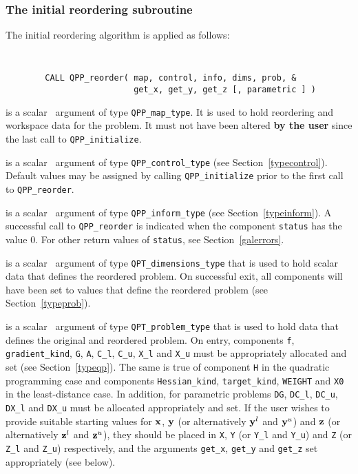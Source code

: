 \documentclass{galahad}
\newcommand{\packagename}{QPP}
\begin{document}
\subsubsection{The initial reordering subroutine}
The initial reordering algorithm is applied as follows: 
\vspace*{-2mm}
{\tt 
\begin{verbatim}
        CALL QPP_reorder( map, control, info, dims, prob, &
                          get_x, get_y, get_z [, parametric ] )
\end{verbatim}
}
\vspace*{-4mm}
\begin{description}
 is a scalar \intentinout\ argument of type 
{\tt \packagename\_map\_type}. 
It is used to hold reordering and workspace data for the problem. 
It must not have been altered {\bf by the user} since the last call
to {\tt \packagename\_initialize}. 
 
 is a scalar \intentin\ argument of type 
{\tt \packagename\_control\_type} 
(see Section~\ref{typecontrol}). 
Default values may be assigned by calling 
{\tt \packagename\_initialize} 
prior to the first call to {\tt \packagename\_reorder}. 
 
 is a scalar \intentout\ argument of type 
{\tt \packagename\_inform\_type} 
(see Section~\ref{typeinform}). 
A successful call to {\tt \packagename\_reor\-der} is indicated 
when the component {\tt status} has the value 0. For other return values 
of {\tt status}, see Section~\ref{galerrors}. 
 
 is a scalar \intentout\ argument of type 
{\tt QPT\_dimensions\_type} that 
is used to hold scalar data that defines the reordered problem. 
On successful exit, all components will have been set to values 
that define the reordered problem (see Section~\ref{typeprob}). 
 
 is a scalar \intentinout\ argument of type 
{\tt QPT\_problem\_type} that 
is used to hold data that defines the original and reordered problem. 
On entry, components {\tt f}, {\tt gradient\_kind}, {\tt G},
{\tt A}, {\tt C\_l}, {\tt C\_u}, {\tt X\_l} and {\tt X\_u} 
must be appropriately allocated and set (see Section~\ref{typeqp}).
The same is true of component {\tt H} in the quadratic programming case
and components {\tt Hessian\_kind}, {\tt target\_kind}, 
{\tt WEIGHT} and {\tt X0} in the least-distance case. 
In addition, for parametric problems
{\tt DG}, {\tt DC\_l}, {\tt DC\_u}, {\tt DX\_l} and {\tt DX\_u}
must be allocated appropriately and set.
If the user wishes to provide suitable starting values for ${\mathbf{x}}$, ${\mathbf{y}}$ 
(or alternatively ${\mathbf{y}}^l$ and ${\mathbf{y}}^u$) and
${\mathbf{z}}$ (or alternatively ${\mathbf{z}}^l$ and ${\mathbf{z}}^u$), 
they should be placed in {\tt X}, {\tt Y} (or {\tt Y\_l} and {\tt Y\_u})
and {\tt Z} (or {\tt Z\_l} and {\tt Z\_u}) respectively,
and the arguments {\tt get\_x}, {\tt get\_y} and {\tt get\_z}
set appropriately (see below). 


\end{description}
\end{document}
